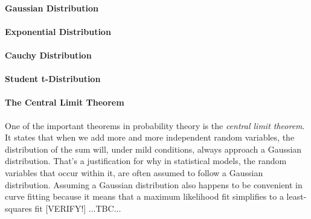 \paragraph{Gaussian Distribution}








\paragraph{Exponential Distribution}

\paragraph{Cauchy Distribution}

\paragraph{Student t-Distribution}


\paragraph{The Central Limit Theorem}
One of the important theorems in probability theory is the \emph{central limit theorem}. It states that when we add more and more independent random variables, the distribution of the sum will, under mild conditions, always approach a Gaussian distribution. That's a justification for why in statistical models, the random variables that occur within it, are often assumed to follow a Gaussian distribution. Assuming a Gaussian distribution also happens to be convenient in curve fitting because it means that a maximum likelihood fit simplifies to a least-squares fit [VERIFY!] ...TBC...

